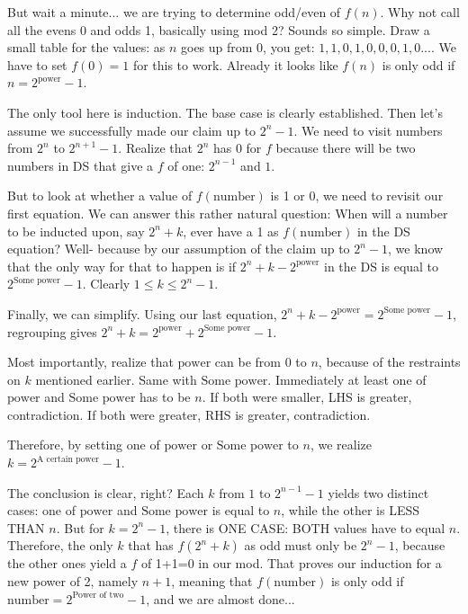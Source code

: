 \begin{enumerate}
 But wait a minute... we are trying to determine odd/even of $f(n)$. Why not call all the evens 0 and odds 1, basically using mod 2? Sounds so simple. Draw a small table for the values: as $n$ goes up from $0$, you get: $1,1,0,1,0,0,0,1,0...$. We have to set $f(0)=1$ for this to work. Already it looks like $f(n)$ is only odd if $n=2^{\textrm{power}}-1$.

 The only tool here is induction. The base case is clearly established. Then let's assume we successfully made our claim up to $2^n-1$. We need to visit numbers from $2^n$ to $2^{n+1}-1$. Realize that $2^n$ has $0$ for $f$ because there will be two numbers in DS that give a $f$ of one: $2^{n-1}$ and $1$. 

 But to look at whether a value of $f(\textrm{number})$ is 1 or 0, we need to revisit our first equation. We can answer this rather natural question: When will a number to be inducted upon, say $2^n+k$, ever have a 1 as $f(\textrm{number})$ in the DS equation? Well- because by our assumption of the claim up to $2^n-1$, we know that the only way for that to happen is if $2^n+k-2^{\textrm{power}}$ in the DS is equal to $2^{\textrm{Some power}} - 1$. Clearly $1 \leq k \leq 2^n - 1$.

 Finally, we can simplify. Using our last equation, $2^n+k-2^{\textrm{power}}=2^{\textrm{Some power}}-1$, regrouping gives $2^n+k=2^{\textrm{power}}+2^{\textrm{Some power}}-1$. 

 Most importantly, realize that $\textrm{power}$ can be from $0$ to $n$, because of the restraints on $k$ mentioned earlier. Same with $\textrm{Some power}$. Immediately at least one of $\textrm{power}$ and $\textrm{Some power}$ has to be $n$. If both were smaller, LHS is greater, contradiction. If both were greater, RHS is greater, contradiction.

 Therefore, by setting one of $\textrm{power}$ or $\textrm{Some power}$ to $n$, we realize $k=2^{\textrm{A certain power}}-1$.

 The conclusion is clear, right? Each $k$ from $1$ to $2^{n-1}-1$ yields two distinct cases: one of $\textrm{power}$ and $\textrm{Some power}$ is equal to $n$, while the other is LESS THAN $n$. But for $k=2^n-1$, there is ONE CASE: BOTH values have to equal $n$. Therefore, the only $k$ that has $f(2^n+k)$ as odd must only be $2^n-1$, because the other ones yield a $f$ of 1+1=0 in our mod. That proves our induction for a new power of 2, namely $n+1$, meaning that $f(\textrm{number})$ is only odd if $\textrm{number} = 2^{\textrm{Power of two}} - 1$, and we are almost done...


\end{enumerate}
